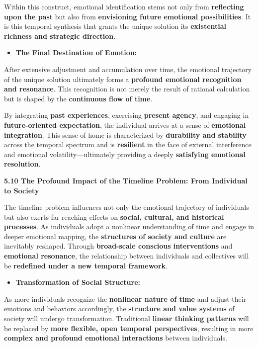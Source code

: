 \documentclass[
]{article}
\begin{document}
Within this construct, emotional identification stems not only from
\textbf{reflecting upon the past} but also from \textbf{envisioning
future emotional possibilities}. It is this temporal synthesis that
grants the unique solution its \textbf{existential richness and
strategic direction}.

\begin{itemize}
\item
  \textbf{The Final Destination of Emotion:}
\end{itemize}

After extensive adjustment and accumulation over time, the emotional
trajectory of the unique solution ultimately forms a \textbf{profound
emotional recognition and resonance}. This recognition is not merely the
result of rational calculation but is shaped by the \textbf{continuous
flow of time}.

By integrating \textbf{past experiences}, exercising \textbf{present
agency}, and engaging in \textbf{future-oriented expectation}, the
individual arrives at a sense of \textbf{emotional integration}. This
sense of home is characterized by \textbf{durability and stability}
across the temporal spectrum and is \textbf{resilient} in the face of
external interference and emotional volatility---ultimately providing a
deeply \textbf{satisfying emotional resolution}.

\textbf{5.10 The Profound Impact of the Timeline Problem: From
Individual to Society}

The timeline problem influences not only the emotional trajectory of
individuals but also exerts far-reaching effects on \textbf{social,
cultural, and historical processes}. As individuals adopt a nonlinear
understanding of time and engage in deeper emotional mapping, the
\textbf{structures of society and culture} are inevitably reshaped.
Through \textbf{broad-scale conscious interventions} and
\textbf{emotional resonance}, the relationship between individuals and
collectives will be \textbf{redefined under a new temporal framework}.

\begin{itemize}
\item
  \textbf{Transformation of Social Structure:}
\end{itemize}

As more individuals recognize the \textbf{nonlinear nature of time} and
adjust their emotions and behaviors accordingly, the \textbf{structure
and value systems} of society will undergo transformation. Traditional
\textbf{linear thinking patterns} will be replaced by \textbf{more
flexible, open temporal perspectives}, resulting in more \textbf{complex
and profound emotional interactions} between individuals.
\end{document}

